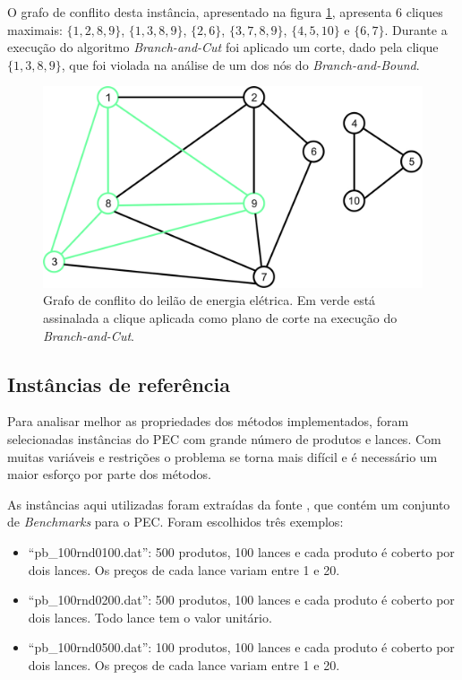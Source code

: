 \documentclass{article}
\begin{document}
    O grafo de conflito desta instância, apresentado na figura \ref{fig:instance}, apresenta 6 cliques maximais: $\{1, 2, 8, 9\}$, $\{1, 3, 8, 9\}$, $\{2, 6\}$, $\{3, 7, 8, 9\}$, $\{4, 5, 10\}$ e $\{6, 7\}$.
    Durante a execução do algoritmo \emph{Branch-and-Cut} foi aplicado um corte, dado pela clique $\{ 1, 3, 8, 9 \}$, que foi violada na análise de um dos nós do \emph{Branch-and-Bound}.
    
    \begin{figure}[H]
        \includegraphics[scale=0.65]{Imagens/GrafoClique.jpg}
             \centering
             \caption{Grafo de conflito do leilão de energia elétrica. Em verde está assinalada a clique aplicada como plano de corte na execução do \emph{Branch-and-Cut}.}
         \label{fig:instance}
    \end{figure} 



    \subsection{Instâncias de referência}
    
    Para analisar melhor as propriedades dos métodos implementados,
    foram selecionadas instâncias do PEC com grande número de produtos e lances. Com muitas variáveis e restrições o problema se torna mais difícil e é necessário um maior esforço por parte dos métodos.
    
    As instâncias aqui utilizadas foram extraídas da fonte \cite{benchmarks}, que contém um conjunto de \emph{Benchmarks} para o PEC. Foram escolhidos três exemplos: 
    \begin{itemize}
        \item \enquote{pb\_100rnd0100.dat}: 500 produtos, 100 lances e cada produto é coberto por dois lances. Os preços de cada lance variam entre 1 e 20.
        \item \enquote{pb\_100rnd0200.dat}: 500 produtos, 100 lances e cada produto é coberto por dois lances. Todo lance tem o valor unitário.
        \item \enquote{pb\_100rnd0500.dat}: 100 produtos, 100 lances e cada produto é coberto por dois lances. Os preços de cada lance variam entre 1 e 20.
    \end{itemize}
    
\end{document}
